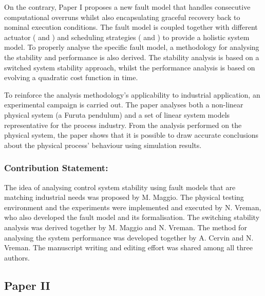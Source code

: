 On the contrary, Paper I proposes a new fault model that handles consecutive computational overruns whilst also encapsulating graceful recovery back to nominal execution conditions.
The fault model is coupled together with different actuator (\tZ{} and \tH{}) and scheduling strategies (\tK{} and \tS{}) to provide a holistic system model.
To properly analyse the specific fault model, a methodology for analysing the stability and performance is also derived.
The stability analysis is based on a switched system stability approach, whilst the performance analysis is based on evolving a quadratic cost function in time.

To reinforce the analysis methodology's applicability to industrial application, an experimental campaign is carried out.
The paper analyses both a non-linear physical system (a Furuta pendulum) and a set of linear system models representative for the process industry.
From the analysis performed on the physical system, the paper shows that it is possible to draw accurate conclusions about the physical process' behaviour using simulation results.

\subsubsection*{Contribution Statement:}%
%
The idea of analysing control system stability using fault models that are matching industrial needs was proposed by M. Maggio.
The physical testing environment and the experiments were implemented and executed by N. Vreman, who also developed the fault model and its formalisation.
The switching stability analysis was derived together by M. Maggio and N. Vreman.
The method for analysing the system performance was developed together by A. Cervin and N. Vreman.
The manuscript writing and editing effort was shared among all three authors.


\subsection*{Paper II}%
%
\begin{quote}
\end{quote}


